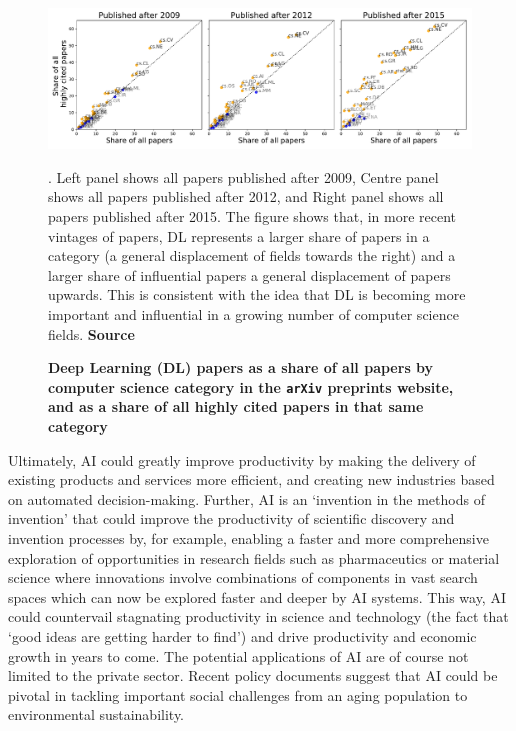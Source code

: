 \documentclass[11pt]{article}
\begin{document}
\begin{figure}
    \centering
    \includegraphics[width=\textwidth]{figure_2.pdf}
    \caption \textbf{Deep Learning (DL) papers as a share of all papers by computer science category in the \texttt{arXiv} preprints website, and as a share of all highly cited papers in that same category}. Left panel shows all papers published after 2009, Centre panel shows all papers published after 2012, and Right panel shows all papers published after 2015. The figure shows that, in more recent vintages of papers, DL represents a larger share of papers in a category (a general displacement of fields towards the right) and a larger share of influential papers a general displacement of papers upwards. This is consistent with the idea that DL is becoming more important and influential in a growing number of computer science fields.
    \textbf{Source}
    \label{fig:dl}
\end{figure}

Ultimately, AI could greatly improve productivity by making the delivery of existing products and services more efficient, and creating new industries based on automated decision-making. Further, AI is an `invention in the methods of invention' that could improve the productivity of scientific discovery and invention processes by, for example, enabling a faster and more comprehensive exploration of opportunities in research fields such as pharmaceutics or material science where innovations involve combinations of components in vast search spaces which can now be explored faster and deeper by AI systems. This way, AI could countervail stagnating productivity in science and technology (the fact that `good ideas are getting harder to find') and drive productivity and economic growth in years to come.  The potential applications of AI are of course not limited to the private sector. Recent policy documents suggest that AI could be pivotal in tackling important social challenges from an aging population to environmental sustainability. 
\end{document}
